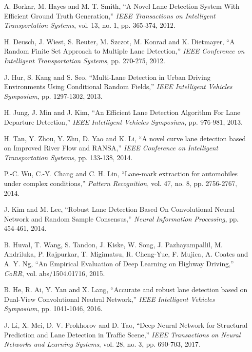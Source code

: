 \documentclass[fleqn,10pt,twocolumn]{ICCAS2019}
\begin{document}
\begin{thebibliography}{99}

A. Borkar, M. Hayes and M. T. Smith, ``A Novel Lane Detection System With Efficient Ground Truth Generation,'' {\it IEEE Transactions on Intelligent Transportation Systems}, vol. 13, no. 1, pp. 365-374, 2012.

H. Deusch, J. Wiest, S. Reuter, M. Szczot, M. Konrad and K. Dietmayer, ``A Random Finite Set Approach to Multiple Lane Detection,'' {\it IEEE Conference on Intelligent Transportation Systems}, pp. 270-275, 2012.

J. Hur, S. Kang and S. Seo, ``Multi-Lane Detection in Urban Driving Environments Using
Conditional Random Fields,'' {\it IEEE Intelligent Vehicles Symposium}, pp. 1297-1302, 2013.

H. Jung, J. Min and J. Kim, ``An Efficient Lane Detection Algorithm For Lane Departure Detection,'' {\it IEEE Intelligent Vehicles Symposium}, pp. 976-981, 2013.

 H. Tan, Y. Zhou, Y. Zhu, D. Yao and K. Li, ``A novel curve lane detection based on Improved River Flow and RANSA,'' {\it IEEE Conference on Intelligent Transportation Systems}, pp. 133-138, 2014.

 P.-C. Wu, C.-Y. Chang and C. H. Lin, ``Lane-mark extraction for automobiles under complex conditions,'' {\it Pattern Recognition}, vol. 47, no. 8, pp. 2756-2767, 2014.

J. Kim and M. Lee, ``Robust Lane Detection Based On Convolutional Neural Network and Random Sample Consensus,'' {\it Neural Information Processing}, pp. 454-461, 2014.

B. Huval, T. Wang, S. Tandon, J. Kiske, W. Song, J. Pazhayampallil, M. Andriluka, P. Rajpurkar, T. Migimatsu, R. Cheng-Yue, F. Mujica, A. Coates and A. Y. Ng, ``An Empirical Evaluation of Deep Learning on Highway Driving,'' {\it CoRR}, vol. abs/1504.01716, 2015.

B. He, R. Ai, Y. Yan and X. Lang, ``Accurate and robust lane detection based on Dual-View Convolutional Neutral Network,'' {\it IEEE Intelligent Vehicles Symposium}, pp. 1041-1046, 2016.

 J. Li, X. Mei, D. V. Prokhorov and D. Tao, ``Deep Neural Network for Structural Prediction and Lane Detection in Traffic Scene,'' {\it IEEE Transactions on Neural Networks and Learning Systems}, vol. 28, no. 3, pp. 690-703, 2017.


\end{thebibliography}
\end{document}
